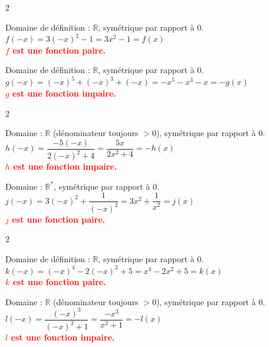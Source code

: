 \documentclass[11pt,a4paper]{article}
\begin{document}
\begin{multicols}{2}
\begin{tcolorbox}[colback=red!5!white,colframe=red!75!black]
Domaine de définition : $\mathbb{R}$, symétrique par rapport à 0.\\[3mm]
$f(-x) = 3(-x)^2-1 = 3x^2-1 = f(x)$\\[3mm]
\textbf{\textcolor{red}{$f$ est une fonction paire.}}
\end{tcolorbox}

\begin{tcolorbox}[colback=red!5!white,colframe=red!75!black]
Domaine de définition : $\mathbb{R}$, symétrique par rapport à 0.\\[3mm]
$g(-x) = (-x)^5+(-x)^3+(-x) = -x^5-x^3-x = -g(x)$\\[3mm]
\textbf{\textcolor{red}{$g$ est une fonction impaire.}}
\end{tcolorbox}
\end{multicols}

\begin{multicols}{2}
\begin{tcolorbox}[colback=red!5!white,colframe=red!75!black]
Domaine : $\mathbb{R}$ (dénominateur toujours $> 0$), symétrique par rapport à 0.\\[3mm]
$h(-x) = \dfrac{-5(-x)}{2(-x)^2+4} = \dfrac{5x}{2x^2+4} = -h(x)$\\[3mm]
\textbf{\textcolor{red}{$h$ est une fonction impaire.}}
\end{tcolorbox}

\begin{tcolorbox}[colback=red!5!white,colframe=red!75!black]
Domaine : $\mathbb{R}^*$, symétrique par rapport à 0.\\[3mm]
$j(-x) = 3(-x)^2+\dfrac{1}{(-x)^2} = 3x^2+\dfrac{1}{x^2} = j(x)$\\[3mm]
\textbf{\textcolor{red}{$j$ est une fonction paire.}}
\end{tcolorbox}
\end{multicols}

\begin{multicols}{2}
\begin{tcolorbox}[colback=red!5!white,colframe=red!75!black]
Domaine de définition : $\mathbb{R}$, symétrique par rapport à 0.\\[3mm]
$k(-x) = (-x)^4-2(-x)^2+5 = x^4-2x^2+5 = k(x)$\\[3mm]
\textbf{\textcolor{red}{$k$ est une fonction paire.}}
\end{tcolorbox}

\begin{tcolorbox}[colback=red!5!white,colframe=red!75!black]
Domaine : $\mathbb{R}$ (dénominateur toujours $> 0$), symétrique par rapport à 0.\\[3mm]
$l(-x) = \dfrac{(-x)^3}{(-x)^2+1} = \dfrac{-x^3}{x^2+1} = -l(x)$\\[3mm]
\textbf{\textcolor{red}{$l$ est une fonction impaire.}}
\end{tcolorbox}
\end{multicols}
\end{document}
